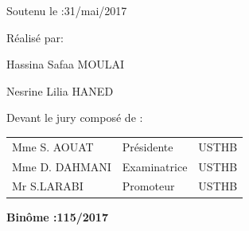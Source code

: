 \documentclass[12pt,a4paper,oneside]{book}
\begin{document}
\begin{titlepage}
\begin{center}
\begin{minipage}{0.5\textwidth}
				\begin{flushleft}\large
				Soutenu le :31/mai/2017
				\end{flushleft}
			\end{minipage}%
			\begin{minipage}{0.5\textwidth}
				\begin{flushright}
					{Réalisé par:}\\
				\end{flushright}
				
				\begin{flushright} \large
					Hassina Safaa \textsc{MOULAI}\\
				\end{flushright}
				
				\begin{flushright} \large
					Nesrine Lilia \textsc{HANED}\\
				\end{flushright}
				
			\end{minipage}
		\begin{flushleft}
			Devant le jury composé de :
		\end{flushleft}	
	
			\Large
			\begin{center}
				
			
				
				
				\begin{tabular}{lll}
					Mme S. AOUAT      & Présidente & USTHB\\
					Mme D. DAHMANI    & Examinatrice  & USTHB\\
					Mr S.LARABI  & Promoteur   & USTHB\\
					
				\end{tabular}
			\end{center}
			
			\begin{center}
				\textbf{Binôme :115/2017}
			\end{center}
		\end{center}
	\end{titlepage}
\end{document}
